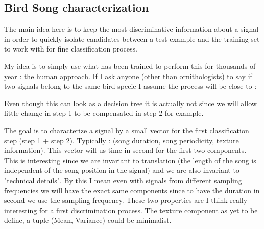 \documentclass[a4paper]{article}
\begin{document}
\subsection{Bird Song characterization}

The main idea here is to keep the most discriminative information about a signal in order to quickly isolate candidates between a test example and the training set to work with for fine classification process.

My idea is to simply use what has been trained to perform this for thousands of year : the human approach.
If I ask anyone (other than ornithologists) to say if two signals belong to the same bird specie I assume the process will be close to :

Even though this can look as a decision tree it is actually not since we will allow little change in step 1 to be compensated in step 2 for example.

The goal is to characterize a signal by a small vector for the first classification step (step 1 + step 2). Typically : (song duration, song periodicity, texture information). This vector will us time in second for the first two components. This is interesting since we are invariant to translation (the length of the song is independent of the song position in the signal) and we are also invariant to "technical details". By this I mean even with signals from different sampling frequencies we will have the exact same components since to have the duration in second we use the sampling frequency. These two properties are I think really interesting for a first discrimination process. The texture component as yet to be define, a tuple (Mean, Variance) could be minimalist.
\\
\end{document}
